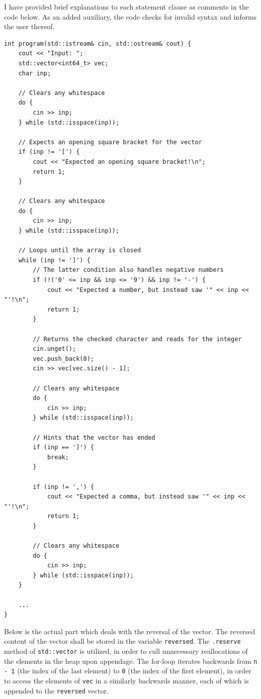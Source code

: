 \documentclass[12pt]{article}
\begin{document}
I have provided brief explanations to each statement clause as comments in the code below. As an added auxiliary, the code checks for invalid syntax and informs the user thereof.

\begin{verbatim}
int program(std::istream& cin, std::ostream& cout) {
    cout << "Input: ";
    std::vector<int64_t> vec;
    char inp;

    // Clears any whitespace
    do {
        cin >> inp;
    } while (std::isspace(inp));

    // Expects an opening square bracket for the vector
    if (inp != '[') {
        cout << "Expected an opening square bracket!\n";
        return 1;
    }

    // Clears any whitespace
    do {
        cin >> inp;
    } while (std::isspace(inp));

    // Loops until the array is closed
    while (inp != ']') {
        // The latter condition also handles negative numbers
        if (!('0' <= inp && inp <= '9') && inp != '-') {
            cout << "Expected a number, but instead saw '" << inp << "'!\n";
            return 1;
        }

        // Returns the checked character and reads for the integer
        cin.unget();
        vec.push_back(0);
        cin >> vec[vec.size() - 1];

        // Clears any whitespace
        do {
            cin >> inp;
        } while (std::isspace(inp));

        // Hints that the vector has ended
        if (inp == ']') {
            break;
        }

        if (inp != ',') {
            cout << "Expected a comma, but instead saw '" << inp << "'!\n";
            return 1;
        }

        // Clears any whitespace
        do {
            cin >> inp;
        } while (std::isspace(inp));
    }

    ...
}
\end{verbatim}
\pagebreak

Below is the actual part which deals with the reversal of the vector. The reversed content of the vector shall be stored in the variable \texttt{reversed}. The \texttt{.reserve} method of \texttt{std::vector} is utilized, in order to cull unnecessary reallocations of the elements in the heap upon appendage. The for-loop iterates backwards from \texttt{n - 1} (the index of the last element) to \texttt{0} (the index of the first element), in order to access the elements of \texttt{vec} in a similarly backwards manner, each of which is appended to the \texttt{reversed} vector.
\end{document}
